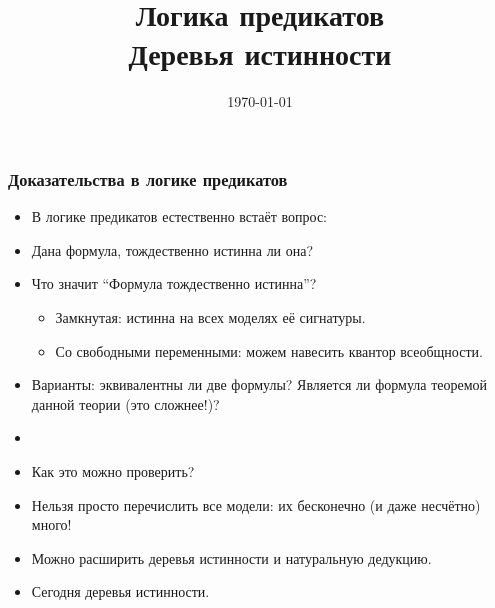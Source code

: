 \documentclass[10pt]{beamer}
\title{Логика предикатов\\Деревья истинности}
\date{\today}
\begin{document}
\begin{frame}[plain]
\maketitle
\end{frame}

\begin{frame}
\frametitle{Доказательства в логике предикатов}
\begin{itemize}
    \item В логике предикатов естественно встаёт вопрос:
    \item Дана формула, тождественно истинна ли она?
    \item Что значит \enquote{Формула тождественно истинна}? \pause 
    \begin{itemize}
        \item Замкнутая: истинна на всех моделях её сигнатуры. \pause
        \item Со свободными переменными: можем навесить квантор всеобщности. \pause
    \end{itemize}
    \item Варианты: эквивалентны ли две формулы? Является ли формула теоремой данной теории (это сложнее!)?
    \item[]
    \item Как это можно проверить?
    \item Нельзя просто перечислить все модели: \pause их бесконечно (и даже несчётно) много!
    \item Можно расширить деревья истинности и натуральную дедукцию. 
    \item Сегодня деревья истинности.
\end{itemize}
\end{frame}
\end{document}
